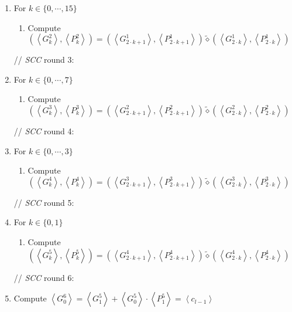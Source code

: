 \documentclass[10pt,journal,compsoc]{IEEEtran}
\begin{document}
\begin{figure*}[!t]
{\begin{minipage} [t]{0.85\textwidth}
\begin{enumerate}[1:]
\begin{enumerate}
\end{enumerate}

// \emph{SCC} round 2:


\item For $k\in \{0,\cdots, 15\}$

\begin{enumerate}
\item Compute $(\left\langle{G^2_k}\right\rangle, \left\langle{P^2_k}\right\rangle)=(\left\langle{G^1_{2\cdot k+1}}\right\rangle, \left\langle{P^1_{2\cdot k+1}}\right\rangle) \tilde{\diamond} (\left\langle{G^1_{2\cdot k}}\right\rangle, \left\langle{P^1_{2\cdot k}}\right\rangle)$
\end{enumerate}

// \emph{SCC} round 3: 
\item For $k\in \{0,\cdots, 7\}$

\begin{enumerate}
\item Compute $(\left\langle{G^3_k}\right\rangle, \left\langle{P^3_k}\right\rangle)=(\left\langle{G^2_{2\cdot k+1}}\right\rangle, \left\langle{P^2_{2\cdot k+1}}\right\rangle) \tilde{\diamond} (\left\langle{G^2_{2\cdot k}}\right\rangle, \left\langle{P^2_{2\cdot k}}\right\rangle)$
\end{enumerate}

// \emph{SCC} round 4: 
\item For $k\in \{0,\cdots, 3\}$

\begin{enumerate}
\item Compute $(\left\langle{G^4_k}\right\rangle, \left\langle{P^4_k}\right\rangle)=(\left\langle{G^3_{2\cdot k+1}}\right\rangle, \left\langle{P^3_{2\cdot k+1}}\right\rangle) \tilde{\diamond} (\left\langle{G^3_{2\cdot k}}\right\rangle, \left\langle{P^3_{2\cdot k}}\right\rangle)$
\end{enumerate}

// \emph{SCC} round 5: 
\item For $k\in \{0, 1\}$

\begin{enumerate}
\item Compute $(\left\langle{G^5_k}\right\rangle, \left\langle{P^5_k}\right\rangle)=(\left\langle{G^4_{2\cdot k+1}}\right\rangle, \left\langle{P^4_{2\cdot k+1}}\right\rangle) \tilde{\diamond} (\left\langle{G^4_{2\cdot k}}\right\rangle, \left\langle{P^4_{2\cdot k}}\right\rangle)$
\end{enumerate}

// \emph{SCC} round 6: 
\item Compute $\left\langle{G^6_0}\right\rangle=\left\langle{G^5_1}\right\rangle+\left\langle{G^5_0}\right\rangle \cdot \left\langle{P^5_1}\right\rangle=\left\langle{c_{l-1}}\right\rangle$



\end{enumerate}
\end{minipage}}
\end{figure*}
\end{document}

